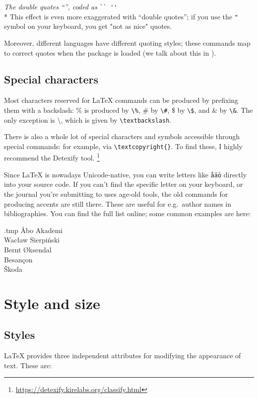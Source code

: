\medskip\noindent\emph{The double quotes ``'', coded as} \verb|`` ''|\\*
This effect is even more exaggerated with ``double quotes'';
if you use the \verb|"| symbol on your keyboard,
you get "not as nice" quotes.

Moreover, different languages have different quoting styles;
these commands map to correct quotes when the  package is loaded
(we talk about this in ).


%
%
\subsection{Special characters}

Most characters reserved for \LaTeX{} commands can be produced by prefixing them with a backslash:
\% is produced by \verb|\%|, \# by \verb|\#|, \$ by \verb|\$|, and \& by \verb|\&|.
The only exception is \textbackslash, which is given by \verb|\textbackslash|.

There is also a whole lot of special characters and symbols accessible
through special commands: for example, \textcopyright{} via \verb|\textcopyright{}|.
To find these, I highly recommend the Detexify tool.
\footnote{\url{https://detexify.kirelabs.org/classify.html}}

\bigskip\noindent%
Since \LaTeX{} is nowadays Unicode-native,
you can write letters like \verb|åäö| directly into your source code.
If you can't find the specific letter on your keyboard,
or the journal you're submitting to uses age-old tools,
the old commands for producing accents are still there.
These are useful for e.g.\ author names in bibliographies.
You can find the full list online;
some common examples are here:
%
\begin{VerbatimOut}{\jobname.tmp}
\r{A}bo Akademi\\
Wac\l{}aw Sierpi\'{n}ski\\
Bernt \O{}ksendal\\
Besan\c{c}on\\
\v{S}koda
\end{VerbatimOut}
\ShowExample


%
%


%
%
%
\section{Style and size}

\subsection{Styles}
\LaTeX{} provides three independent attributes for modifying the appearance of text.
These are:

